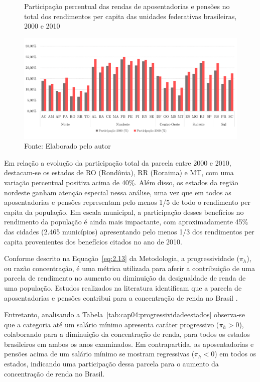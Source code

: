 \begin{figure}[!ht]
    \centering
    \caption{Participação percentual das rendas de aposentadorias e pensões no total dos rendimentos per capita das unidades federativas brasileiras, 2000 e 2010}
    \includegraphics[width=\textwidth]{figs/cap04_aposen_pensao_estados.pdf}
    \caption*{\footnotesize{Fonte: Elaborado pelo autor}}
    \label{fig:cap04:aposen_pensao_estados}
\end{figure}

Em relação a evolução da participação total da parcela entre 2000 e 2010, destacam-se os estados de RO (Rondônia), RR (Roraima) e MT, com uma variação percentual positiva acima de 40\%. Além disso, os estados da região nordeste ganham atenção especial nessa análise, uma vez que em todos as aposentadorias e pensões representam pelo menos 1/5 de todo o rendimento per capita da população. Em escala municipal, a participação desses benefícios no rendimento da população é ainda mais impactante, com aproximadamente 45\% das cidades (2.465 municípios) apresentando pelo menos 1/3 dos rendimentos per capita provenientes dos benefícios citados no ano de 2010.  

Conforme descrito na Equação~\ref{eq:2.13} da Metodologia, a progressividade ($\pi_h$), ou razão concentração, é uma métrica utilizada para aferir a contribuição de uma parcela de rendimento no aumento ou diminuição da desigualdade de renda de uma população. Estudos realizados na literatura identificam que a parcela de aposentadorias e pensões contribui para a concentração de renda no Brasil \cite{cap02_ref22}.

Entretanto, analisando a Tabela~\ref{tab:cap04:progressividadeestados} observa-se que a categoria até um salário mínimo apresenta caráter progressivo ($\pi_h > 0$), colaborando para a diminuição da concentração de renda, para todos os estados brasileiros em ambos os anos examinados. Em contrapartida, as aposentadorias e pensões acima de um salário mínimo se mostram regressivas ($\pi_h < 0$) em todos os estados, indicando uma participação dessa parcela para o aumento da concentração de renda no Brasil.

